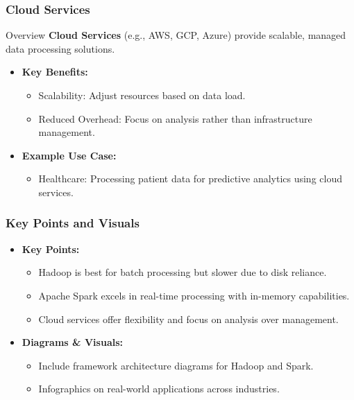 \documentclass[aspectratio=169]{beamer}
\begin{document}
\begin{frame}[fragile]
    \frametitle{Cloud Services}
    \begin{block}{Overview}
        \textbf{Cloud Services} (e.g., AWS, GCP, Azure) provide scalable, managed data processing solutions.
    \end{block}
    \begin{itemize}
        \item \textbf{Key Benefits:}
        \begin{itemize}
            \item Scalability: Adjust resources based on data load.
            \item Reduced Overhead: Focus on analysis rather than infrastructure management.
        \end{itemize}
        \item \textbf{Example Use Case:}
        \begin{itemize}
            \item Healthcare: Processing patient data for predictive analytics using cloud services.
        \end{itemize}
    \end{itemize}
\end{frame}

\begin{frame}[fragile]
    \frametitle{Key Points and Visuals}
    \begin{itemize}
        \item \textbf{Key Points:}
        \begin{itemize}
            \item Hadoop is best for batch processing but slower due to disk reliance.
            \item Apache Spark excels in real-time processing with in-memory capabilities.
            \item Cloud services offer flexibility and focus on analysis over management.
        \end{itemize}
        \item \textbf{Diagrams & Visuals:}
        \begin{itemize}
            \item Include framework architecture diagrams for Hadoop and Spark.
            \item Infographics on real-world applications across industries.
        \end{itemize}
    \end{itemize}
\end{frame}
\end{document}
